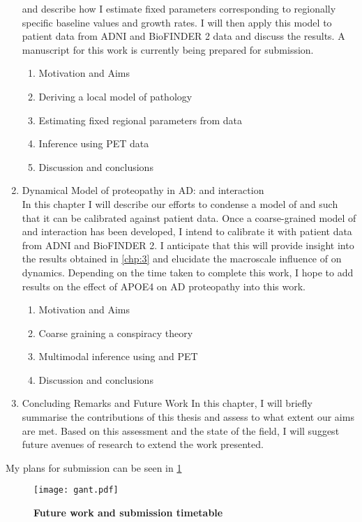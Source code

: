 \begin{enumerate}
    and describe how I estimate fixed parameters corresponding to regionally
    specific baseline values and growth rates. I will then apply this model to 
    patient data from ADNI and BioFINDER 2 data and discuss the results. A 
    manuscript for this work is currently being prepared for submission.
    \begin{enumerate}
        \item Motivation and Aims
        \item Deriving a local model of \TP pathology
        \item Estimating fixed regional parameters from data
        \item Inference using \TP PET data
        \item Discussion and conclusions
    \end{enumerate}
    \item Dynamical Model of proteopathy in AD: \AB and \TP interaction \\
    In this chapter I will describe our efforts to condense a model of \AB and
    \TP such that it can be calibrated against patient data. Once a
    coarse-grained model of \AB and \TP interaction has been developed, I intend
    to calibrate it with patient data from ADNI and BioFINDER 2. I anticipate
    that this will provide insight into the results obtained in \cref{chp:3} and
    elucidate the macroscale influence of \AB on \TP dynamics. Depending on the
    time taken to complete this work, I hope to add results on the effect
    of APOE4 on AD proteopathy into this work.
    \begin{enumerate}
        \item Motivation and Aims 
        \item Coarse graining a conspiracy theory
        \item Multimodal inference using \AB and \TP PET 
        \item Discussion and conclusions
    \end{enumerate}
    \item Concluding Remarks and Future Work
    In this chapter, I will briefly summarise the contributions of this thesis 
    and assess to what extent our aims are met. Based on this assessment and the 
    state of the field, I will suggest future avenues of research to extend the 
    work presented.
\end{enumerate}

My plans for submission can be seen in \cref{fig:stupid-gant-chart}

\begin{figure}[H]
    \centering
    \texttt{[image: gant.pdf]}
    \caption{\textbf{Future work and submission timetable}}
    \label{fig:stupid-gant-chart}
\end{figure}
